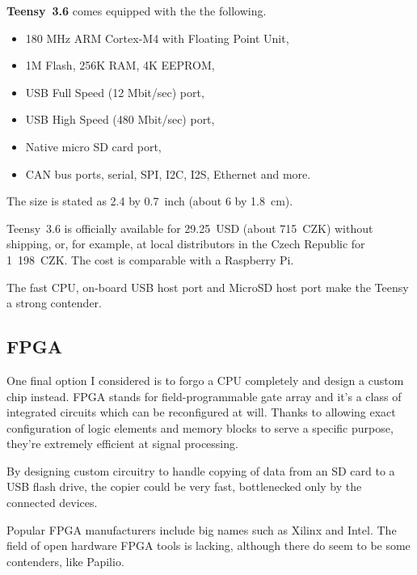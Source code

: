             \textbf{Teensy~3.6} comes equipped with the the following.
            
            \begin{itemize}
                \item 180 MHz ARM Cortex-M4 with Floating Point Unit,
                \item 1M Flash, 256K RAM, 4K EEPROM,
                \item USB Full Speed (12 Mbit/sec) port,
                \item USB High Speed (480 Mbit/sec) port,
                \item Native micro SD card port,
                \item CAN bus ports, serial, SPI, I2C, I2S, Ethernet and more.
            \end{itemize}
            
            The size is stated as 2.4 by 0.7~inch (about 6 by 1.8~cm).
            
            Teensy~3.6 is officially available for 29.25~USD (about 715~CZK) without shipping\cite{teensy-36}, or, for example, at local distributors in the Czech Republic for 1~198~CZK\cite{teensy-36-snailshop}.  The cost is comparable with a Raspberry Pi.  
            
            The fast CPU, on-board USB host port and MicroSD host port make the Teensy a strong contender.
            
            
        \subsection{FPGA}
            One final option I considered is to forgo a CPU completely and design a custom chip instead.  FPGA stands for field-programmable gate array and it's a class of integrated circuits which can be reconfigured at will.  Thanks to allowing exact configuration of logic elements and memory blocks to serve a specific purpose, they're extremely efficient at signal processing\cite{sadrozinski2016applications}.
            
            By designing custom circuitry to handle copying of data from an SD card to a USB flash drive, the copier could be very fast, bottlenecked only by the connected devices.
            
            Popular FPGA manufacturers include big names such as Xilinx\cite{fpga-xilinx} and Intel\cite{fpga-intel}.  The field of open hardware FPGA tools is lacking, although there do seem to be some contenders, like Papilio\cite{fpga-papilio}. 
            
